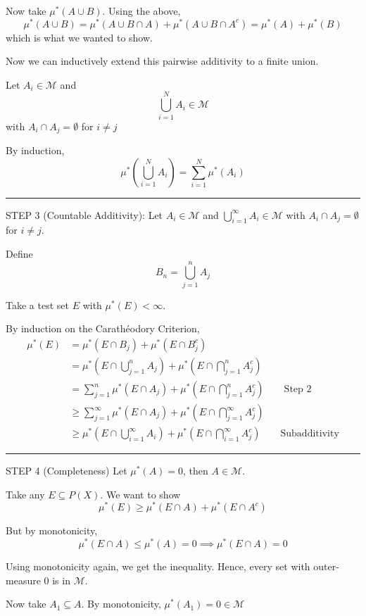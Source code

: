 \documentclass[12pt]{report}
\newcommand{\M}{\mathcal{M}}
\newcommand{\sub}{\subseteq}
\renewcommand{\div}{\vspace*{10pt}\hrule\vspace*{10pt}}
\newenvironment*{tbox}[2][gray]{
    \begin{tcolorbox}[
        parbox=false,
        colback=#1!5!white,
        colframe=#1!75!black,
        breakable,
        title={#2}
    ]}
    {\end{tcolorbox}}
\begin{document}
\begin{tbox}{\textbf{Carathéodory Procedure:} If $\mu^*$ is an outer measure and $\M$ are $\mu^*$-measurable sets, then $\M$ is a $\sigma$-algebra and $\mu^*\big\vert_{\M}$ is a measure on $\M$}
        Now take $\mu^*(A \cup B)$. Using the above, 
        \[\mu^*(A \cup B) = \mu^*(A \cup B \cap A) + \mu^*(A \cup B \cap A^c) = \mu^*(A) + \mu^*(B)\]
        which is what we wanted to show. 

        Now we can inductively extend this pairwise additivity to a finite union.

        Let $A_i \in \M$ and 
        \[\bigcup_{i=1}^N A_i \in \M\]
        with $A_i \cap A_j = \emptyset$ for $i \neq j$

        By induction, 
        \[\mu^*\left(\bigcup_{i=1}^N A_i\right) = \sum_{i=1}^{N} \mu^*(A_i)\]
        
        \div 

        STEP 3 (Countable Additivity): Let $A_i \in \M$ and $\bigcup_{i=1}^\infty A_i \in \M$ with $A_i \cap A_j = \emptyset$ for $i \neq j$.

        Define 
        \[B_n = \bigcup_{j=1}^n A_j\]

        Take a test set $E$ with $\mu^*(E) < \infty$. 

        By induction on the Carathéodory Criterion,
        \begin{align*}
            \mu^*(E) &= \mu^*(E \cap B_j) + \mu^*(E \cap B_j^c)\\ 
                &= \mu^*\left(E \cap \bigcup_{j=1}^n A_j\right) + \mu^*\left(E \cap \bigcap_{j=1}^n A_j^c\right)\\ 
                &= \sum_{j=1}^{n} \mu^*(E \cap A_j) + \mu^*(E \cap \bigcap_{j=1}^n A_j^c) \qquad \text{Step 2}\\ 
                &\geq \sum_{j=1}^{\infty} \mu^*(E \cap A_j) + \mu^*(E \cap \bigcap_{j=1}^{\infty} A_j^c)\\ 
                &\geq \mu^*\left(E \cap \bigcup_{i=1}^\infty  A_i\right) + \mu^*\left(E \cap \bigcap_{i=1}^{\infty} A_j^c\right) \qquad \text{Subadditivity}
        \end{align*}
        
        \div

        STEP 4 (Completeness) Let $\mu^*(A) = 0$, then $A \in \M$. 

        Take any $E \sub P(X)$. We want to show 
        \[\mu^*(E) \geq \mu^*(E \cap A) + \mu^*(E \cap A^c)\]

        But by monotonicity, 
        \[\mu^*(E \cap A) \leq \mu^*(A) = 0 \implies \mu^*(E \cap A) = 0\]

        Using monotonicity again, we get the inequality. Hence, every set with outer-measure $0$ is in $\M$.  

        Now take $A_1 \sub A$. By monotonicity, $\mu^*(A_1) = 0 \in \M$    
    \end{tbox}
\end{document}
